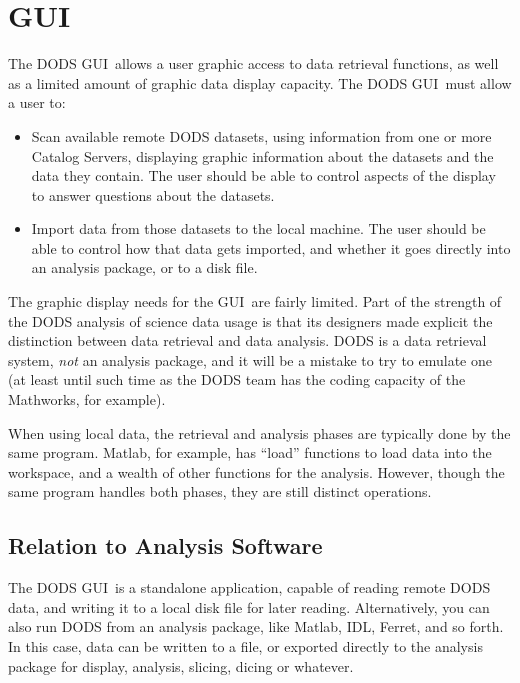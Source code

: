 \documentclass[10pt]{report}
\newcommand{\cs}{Catalog Server}
\newcommand{\gui}{GUI}
\begin{document}
\cbend

\chapter{GUI}
\label{sec:gui}

The DODS \gui\ allows a user graphic access to data retrieval
functions, as well as a limited amount of graphic data display
capacity.  The DODS \gui\ must allow a user to:

\begin{itemize}
\item Scan available remote DODS datasets, using information from one
  or more \cs s, displaying graphic information about the datasets
  and the data they contain.  The user should be able to control
  aspects of the display to answer questions about the datasets.
\item Import data from those datasets to the local machine.  The user
  should be able to control how that data gets imported, and whether
  it goes directly into an analysis package, or to a disk file.
\end{itemize}

The graphic display needs for the \gui\ are fairly limited.  Part of
the strength of the DODS analysis of science data usage is that its
designers made explicit the distinction between data retrieval and
data analysis.  DODS is a data retrieval system, \emph{not} an
analysis package, and it will be a mistake to try to emulate one (at
least until such time as the DODS team has the coding capacity of the
Mathworks, for example).

When using local data, the retrieval and analysis phases
are typically done by the same program.  Matlab, for example, has
``load'' functions to load data into the workspace, and a wealth of
other functions for the analysis.  However, though the same program
handles both phases, they are still distinct operations.  

\section{Relation to Analysis Software}
\label{sec:analysis}

The DODS \gui\ is a standalone application, capable of reading remote
DODS data, and writing it to a local disk file for later reading.
Alternatively, you can also run DODS from an analysis package, like
Matlab, IDL, Ferret, and so forth.  In this case, data can be written
to a file, or exported directly to the analysis package for display,
analysis, slicing, dicing or whatever.
\end{document}

